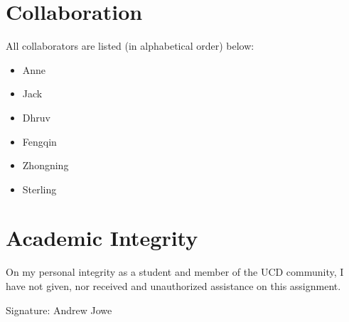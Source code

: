 \documentclass[17pt]{extarticle}
\begin{document}
\section*{Collaboration}
All collaborators are listed (in alphabetical order) below:
\begin{itemize}
    \item Anne
    \item Jack
    \item Dhruv
    \item Fengqin
    \item Zhongning
    \item Sterling
\end{itemize}

\section*{Academic Integrity}
On my personal integrity as a student and member of the UCD community, I have not given, nor received and unauthorized assistance on this assignment.

Signature: Andrew Jowe
\end{document}
